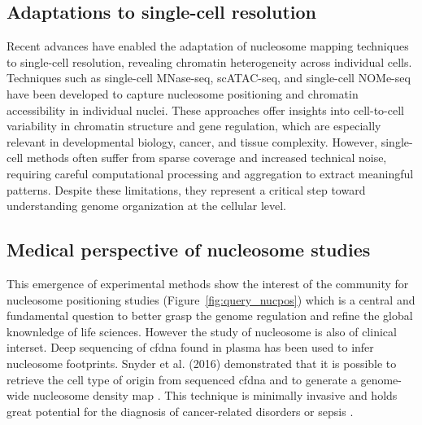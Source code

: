 \documentclass[11pt]{book}
\begin{document}
\subsection{Adaptations to single-cell resolution}
Recent advances have enabled the adaptation of nucleosome mapping techniques to single-cell resolution, revealing chromatin heterogeneity across individual cells. Techniques such as single-cell MNase-seq, scATAC-seq, and single-cell NOMe-seq have been developed to capture nucleosome positioning and chromatin accessibility in individual nuclei. These approaches offer insights into cell-to-cell variability in chromatin structure and gene regulation, which are especially relevant in developmental biology, cancer, and tissue complexity.
However, single-cell methods often suffer from sparse coverage and increased technical noise, requiring careful computational processing and aggregation to extract meaningful patterns. Despite these limitations, they represent a critical step toward understanding genome organization at the cellular level.

\subsection{Medical perspective of nucleosome studies}
This emergence of experimental methods show the interest of the community for nucleosome positioning studies (Figure~\ref{fig:query_nucpos}) which is a central and fundamental question to better grasp the genome regulation and refine the global knownledge of life sciences. However the study of nucleosome is also of clinical interset. Deep sequencing of \gls{cfdna} found in plasma has been used to infer nucleosome footprints. Snyder et al. (2016) demonstrated that it is possible to retrieve the cell type of origin from sequenced \gls{cfdna} and to generate a genome-wide nucleosome density map \cite{snyderCellfreeDNAComprises2016}. This technique is minimally invasive and holds great potential for the diagnosis of cancer-related disorders \cite{penny_chromatin_2024, tejerina-miranda_determining_2025} or sepsis
\cite{su_circulating_2024, garcia-gimenez_circulating_2025}.

\newpage
\end{document}
